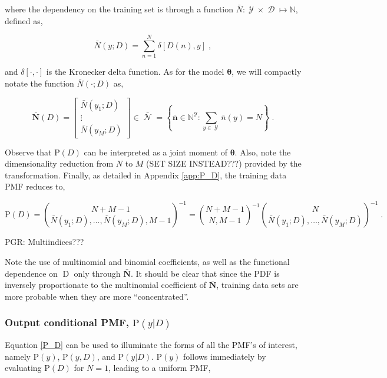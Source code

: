 \documentclass[12pt]{report}
\DeclareMathOperator{\Drm}{\mathrm{D}}
\DeclareMathOperator{\Ycal}{\mathcal{Y}}
\DeclareMathOperator{\Dcal}{\mathcal{D}}
\DeclareMathOperator{\Ncal}{\mathcal{N}}
\begin{document}
where the dependency on the training set is through a function $\bar{N} : \Ycal \times \Dcal \mapsto \mathbb{N}$, defined as,

\begin{equation}
\bar{N}(y;D) = \sum_{n=1}^N \delta[D(n),y] \;,
\end{equation}

and $\delta[\cdot,\cdot]$ is the Kronecker delta function. As for the model $\bm{\theta}$, we will compactly notate the function $\bar{N}(\cdot;D)$ as,

\begin{equation}
\bar{\bm{N}}(D) = \begin{bmatrix} \bar{N}(y_1;D) \\ \vdots \\ \bar{N}(y_M;D) \end{bmatrix} \in \bar{\Ncal}
= \left\{ \bar{\bm{n}} \in \mathbb{N}^{\Ycal}: \sum_{y \in \Ycal} \bar{n}(y) = N \right\} \;.
\end{equation}



Observe that $\text{P}(D)$ can be interpreted as a joint moment of $\bm{\theta}$. Also, note the dimensionality reduction from $N$ to $M$ (SET SIZE INSTEAD???) provided by the transformation. Finally, as detailed in Appendix \ref{app:P_D}, the training data PMF reduces to,

\begin{equation} \label{P_D}
\text{P}(D) = \binom{N+M-1}{\bar{N}(y_1;D),\ldots,\bar{N}(y_M;D),M-1}^{-1} 
= \binom{N+M-1}{N,M-1}^{-1} \binom{N}{\bar{N}(y_1;D),\ldots,\bar{N}(y_M;D)}^{-1} \;.
\end{equation}

PGR: Multiindices???

Note the use of multinomial and binomial coefficients, as well as the functional dependence on $\Drm$ only through $\bar{\bm{N}}$. It should be clear that since the PDF is inversely proportionate to the multinomial coefficient of $\bar{\bm{N}}$, training data sets are more probable when they are more ``concentrated''. 





\subsubsection{Output conditional PMF, $\text{P}(y | D)$}

Equation \eqref{P_D} can be used to illuminate the forms of all the PMF's of interest, namely $\text{P}(y)$, $\text{P}(y,D)$, and $\text{P}(y | D)$.  $\text{P}(y)$ follows immediately by evaluating $\text{P}(D)$ for $N=1$, leading to a uniform PMF,
\end{document}
